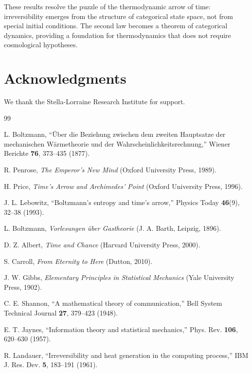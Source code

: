 \documentclass[twocolumn,10pt]{article}
\begin{document}
These results resolve the puzzle of the thermodynamic arrow of time: irreversibility emerges from the structure of categorical state space, not from special initial conditions. The second law becomes a theorem of categorical dynamics, providing a foundation for thermodynamics that does not require cosmological hypotheses.

\section*{Acknowledgments}

We thank the Stella-Lorraine Research Institute for support.


\begin{thebibliography}{99}

 L. Boltzmann, ``\"{U}ber die Beziehung zwischen dem zweiten Hauptsatze der mechanischen W\"{a}rmetheorie und der Wahrscheinlichkeitsrechnung,'' Wiener Berichte \textbf{76}, 373--435 (1877).

 R. Penrose, \textit{The Emperor's New Mind} (Oxford University Press, 1989).

 H. Price, \textit{Time's Arrow and Archimedes' Point} (Oxford University Press, 1996).

 J. L. Lebowitz, ``Boltzmann's entropy and time's arrow,'' Physics Today \textbf{46}(9), 32--38 (1993).

 L. Boltzmann, \textit{Vorlesungen \"{u}ber Gastheorie} (J. A. Barth, Leipzig, 1896).

 D. Z. Albert, \textit{Time and Chance} (Harvard University Press, 2000).

 S. Carroll, \textit{From Eternity to Here} (Dutton, 2010).

 J. W. Gibbs, \textit{Elementary Principles in Statistical Mechanics} (Yale University Press, 1902).

 C. E. Shannon, ``A mathematical theory of communication,'' Bell System Technical Journal \textbf{27}, 379--423 (1948).

 E. T. Jaynes, ``Information theory and statistical mechanics,'' Phys. Rev. \textbf{106}, 620--630 (1957).

 R. Landauer, ``Irreversibility and heat generation in the computing process,'' IBM J. Res. Dev. \textbf{5}, 183--191 (1961).


\end{thebibliography}
\end{document}
